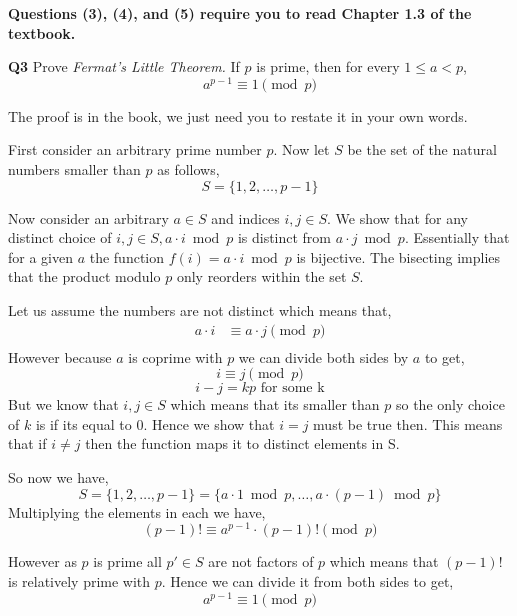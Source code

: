\documentclass[12pt]{article}
\newcommand{\question}[3][Q]{
\begin{description}
\item \textbf{#1{#2}} #3
\end{description}
}
\newcommand{\hint}[1]{{\footnotesize
    \begin{description}
    [leftmargin=3.3em,style=nextline]
        \item[Hint:] {#1}
    \end{description}}   
}
\begin{document}
\newpage 

\textbf{Questions (3), (4), and (5) require you to read Chapter 1.3 of the textbook.}

\question{3}{
    Prove \textit{Fermat's Little Theorem.} If $p$ is prime, then for every $1 \le a < p$,
    $$a^{p-1} \equiv 1 \pmod{p}$$

    \hint{The proof is in the book, we just need you to restate it in your own words.}
}
\begin{answer}
    First consider an arbitrary prime number $p$. Now let $S$ be the set of the natural numbers smaller than $p$ as follows, 
    $$ S = \{1,2,\dots,p-1\} $$ 

Now consider an arbitrary $a \in S$ and indices $i,j \in S$. We show that for any distinct choice of $i,j \in S, a\cdot i \bmod p$ is distinct from $a \cdot j \bmod p$. Essentially that for a given  $a$ the function $f(i) = a \cdot i \bmod p$ is bijective. The bisecting implies that the product modulo $p$ only reorders within the set $S$.

Let us assume the numbers are not distinct which means that, 
\begin{align*}
    a \cdot i &\equiv a \cdot j \pmod p \\
\end{align*}
However because $a$ is coprime with $p$ we can divide both sides by $a$ to get, 
$$  i \equiv j \pmod p $$ 
$$ i -j = kp \text{ for some k}$$ 
But we know that $i,j \in S$ which means that its smaller than $p$ so the only choice of $k$ is if its equal to 0. Hence we show that $i = j$ must be true then. This means that if $i \ne j$ then the function maps it to distinct elements in S.

So now we have, 
$$ S = \{1,2,\dots,p-1\} = \{a \cdot 1 \bmod p, \dots, a \cdot (p-1) \bmod p\} $$ 
Multiplying the elements in each we have, 
$$ (p-1)! \equiv a^{p-1}\cdot (p - 1)!  \pmod p $$ 

However as $p$ is prime all $p' \in S$ are not factors of $p$ which means that $(p-1)!$  is relatively prime with $p$. Hence we can divide it from both sides to get, 
$$ a^{p-1}\equiv 1  \pmod p $$ 



\end{answer}
\newpage
\end{document}
